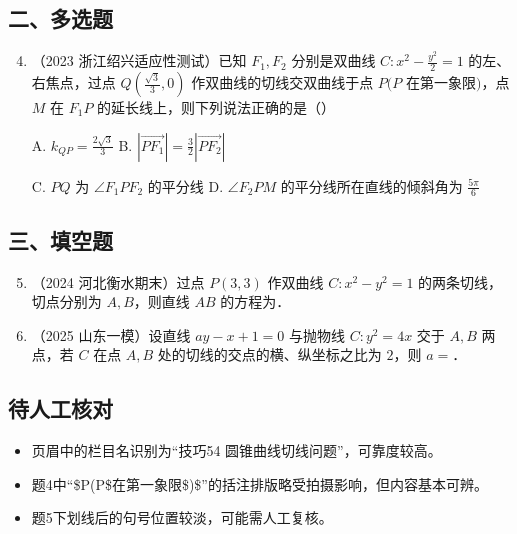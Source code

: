 \documentclass[UTF8,a4paper,11pt]{ctexart}
\begin{document}
\subsection*{二、多选题}
\begin{enumerate}
  \setcounter{enumi}{3}
  \item （2023 浙江绍兴适应性测试）已知 $F_1,F_2$ 分别是双曲线 $C:x^2-\frac{y^2}{2}=1$ 的左、右焦点，过点 $Q\left(\frac{\sqrt{3}}{3},0\right)$ 作双曲线的切线交双曲线于点 $P(P$ 在第一象限$)$，点 $M$ 在 $F_1P$ 的延长线上，则下列说法正确的是\hfill（\qquad）
  
  A. $k_{QP}=\frac{2\sqrt{3}}{3}$ \qquad B. $|\overrightarrow{PF_1}|=\frac{3}{2}|\overrightarrow{PF_2}|$
  
  C. $PQ$ 为 $\angle F_1PF_2$ 的平分线 \qquad D. $\angle F_2PM$ 的平分线所在直线的倾斜角为 $\frac{5\pi}{6}$
\end{enumerate}

\subsection*{三、填空题}
\begin{enumerate}
  \setcounter{enumi}{4}
  \item （2024 河北衡水期末）过点 $P(3,3)$ 作双曲线 $C:x^2-y^2=1$ 的两条切线，切点分别为 $A,B$，则直线 $AB$ 的方程为\underline{\qquad\qquad\qquad\qquad}．
  
  \item （2025 山东一模）设直线 $ay-x+1=0$ 与抛物线 $C:y^2=4x$ 交于 $A,B$ 两点，若 $C$ 在点 $A,B$ 处的切线的交点的横、纵坐标之比为 $2$，则 $a=$\underline{\qquad\qquad\qquad}．
\end{enumerate}

\subsection*{待人工核对}

\begin{itemize}

\item 页眉中的栏目名识别为“技巧54 圆锥曲线切线问题”，可靠度较高。

\item 题4中“\$P(P\$在第一象限\$)\$”的括注排版略受拍摄影响，但内容基本可辨。

\item 题5下划线后的句号位置较淡，可能需人工复核。

\end{itemize}
\end{document}
